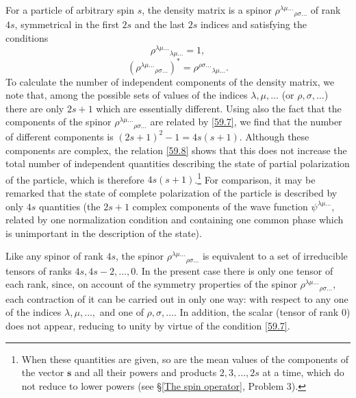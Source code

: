 For a particle of arbitrary spin $ s $, the density matrix is a spinor $ \rho^{\lambda\mu\dots}{}_{\rho\sigma\dots} $ of rank $ 4s $, symmetrical in the first $ 2s $ and the last $ 2s $ indices and satisfying the conditions
\begin{equation}\label{59.7}
\rho^{\lambda\mu\dots}{}_{\lambda\mu\dots}=1,
\end{equation}
\begin{equation}\label{59.8}
\left(\rho^{\lambda\mu\dots}{}_{\rho\sigma\dots} \right)^*=\rho^{\rho\sigma\dots}{}_{\lambda\mu\dots}.
\end{equation}
To calculate the number of independent components of the density matrix, we note that, among the possible sets of values of the indices $ \lambda,\mu,\dots $ (or $ \rho,\sigma,\dots $) there are only $ 2s + 1 $ which are essentially different. Using also the fact that the components of the spinor $ \rho^{\lambda\mu\dots}{}_{\rho\sigma\dots} $ are related by \eqref{59.7}, we find that the number of different components is $ (2s + 1)^2- 1 = 4s (s + 1) $. Although these components are complex, the relation \eqref{59.8} shows that this does not increase the total number of independent quantities describing the state of partial polarization of the particle, which is therefore $ 4s (s+ 1) $.\footnote{When these quantities are given, so are the mean values of the components of the vector $ \bm{s} $ and all their powers and products $ 2, 3, \dots, 2s $ at a time, which do not reduce to lower powers (see \S\ref{The spin operator}, Problem 3).
} For comparison, it may be remarked that the state of complete polarization of the particle is described by only $ 4s $ quantities (the $ 2s + 1 $ complex components of the wave function $\psi^{\lambda\mu\dots}$, related by one normalization condition and containing one common phase which is unimportant in the description of the state).

Like any spinor of rank $ 4s $, the spinor $ \rho^{\lambda\mu\dots}{}_{\rho\sigma\dots} $ is equivalent to a set of irreducible tensors of ranks $ 4s, 4s - 2, \dots, 0 $. In the present case there is only one tensor of each rank, since, on account of the symmetry properties of the spinor $ \rho^{\lambda\mu\dots}{}_{\rho\sigma\dots} $, each contraction of it can be carried out in only one way: with respect to any one of the indices $ \lambda, \mu, \dots, $ and one of $  \rho, \sigma,\dots $. In addition, the scalar (tensor of rank $ 0 $) does not appear, reducing to unity by virtue of the condition \eqref{59.7}.

